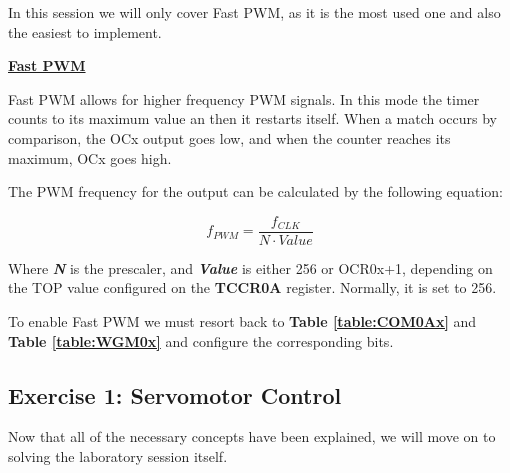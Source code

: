 \begin{table}[H]
\end{table}

\clearpage

In this session we will only cover Fast PWM, as it is the most used one and also the easiest to implement.

\medskip
\underline{\textbf{Fast PWM}}
\medskip

Fast PWM allows for higher frequency PWM signals. In this mode the timer counts to its maximum value an then it restarts itself. When a match occurs by comparison, the OCx output goes low, and when the counter reaches its maximum, OCx goes high.\medskip

The PWM frequency for the output can be calculated by the following equation:

\begin{equation*}
    f_{PWM} = \dfrac{f_{CLK}}{N \cdot \mathit{Value}}
\end{equation*}\medskip

\noindent Where \textbf{\textit{N}} is the prescaler, and \textbf{\textit{Value}} is either 256 or OCR0x+1, depending on the TOP value configured on the \textbf{TCCR0A} register. Normally, it is set to 256.\medskip

To enable Fast PWM we must resort back to \textbf{Table \ref{table:COM0Ax}} and \textbf{Table \ref{table:WGM0x}} and configure the corresponding bits. 


\clearpage

\subsection{Exercise 1: Servomotor Control}

Now that all of the necessary concepts have been explained, we will move on to solving the laboratory session itself. \medskip

